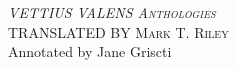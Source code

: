 \begin{titlingpage}
\centering
{\Huge\scshape \textsl{VETTIUS VALENS Anthologies}\\ [1in]}
{\small\scshape TRANSLATED BY Mark T. Riley} \\
{\small Annotated by Jane Griscti}
\end{titlingpage}